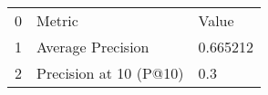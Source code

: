 \begin{tabular}{lll}
\toprule
0 &                  Metric &     Value \\
1 &       Average Precision &  0.665212 \\
2 &  Precision at 10 (P@10) &       0.3 \\
\bottomrule
\end{tabular}
